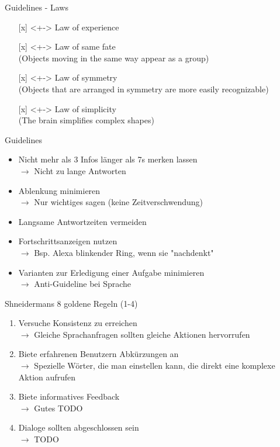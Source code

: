 \documentclass[
  10pt
, handout
]{beamer}
\begin{document}
\begin{frame}{Guidelines - Laws}
  \begin{itemize}
    \item[{[x]}]<+-> Law of experience
    \item[{[x]}]<+-> Law of same fate \\ (Objects moving in the same way appear as a group)
    \item[{[x]}]<+-> Law of symmetry \\ (Objects that are arranged in symmetry are more easily recognizable)
    \item[{[x]}]<+-> Law of simplicity \\ (The brain simplifies complex shapes)
  \end{itemize}
\end{frame}

\begin{frame}{Guidelines}
  \begin{itemize}
    \item Nicht mehr als 3 Infos länger als 7s merken lassen
    \\ $\rightarrow$  Nicht zu lange Antworten
    \item Ablenkung minimieren \\ $\rightarrow$ Nur wichtiges sagen (keine Zeitverschwendung)
    \item Langsame Antwortzeiten vermeiden
    \item Fortschrittsanzeigen nutzen \\ $\rightarrow$ Bsp. Alexa blinkender Ring, wenn sie "nachdenkt"
    \item Varianten zur Erledigung einer Aufgabe minimieren \\ $\rightarrow$ Anti-Guideline bei Sprache
  \end{itemize}
\end{frame}

\begin{frame}{Shneidermans 8 goldene Regeln (1-4)}
  \begin{enumerate}
    \item<+-> Versuche Konsistenz zu erreichen \\ $\rightarrow$ Gleiche Sprachanfragen sollten gleiche Aktionen hervorrufen
    \item<+-> Biete erfahrenen Benutzern Abkürzungen an \\ $\rightarrow$ Spezielle Wörter, die man einstellen kann, die direkt eine komplexe Aktion aufrufen
    \item<+-> Biete informatives Feedback \\ $\rightarrow$ Gutes TODO
    \item<+-> Dialoge sollten abgeschlossen sein \\ $\rightarrow$ TODO
  \end{enumerate}
\end{frame}
\end{document}
